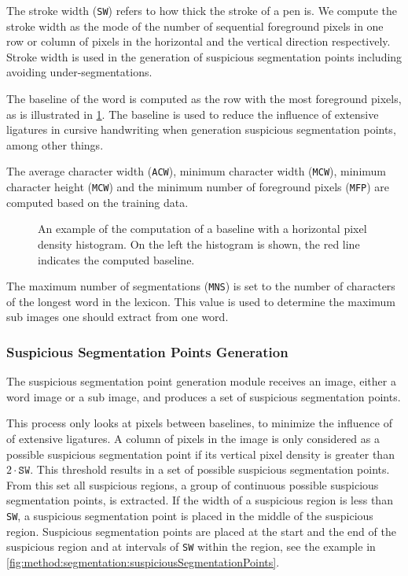	The stroke width (\texttt{SW}) refers to how thick the stroke of a pen is. We compute the stroke width as the mode of the number of sequential foreground pixels in one row or column of pixels in the horizontal and the vertical direction respectively. Stroke width is used in the generation of suspicious segmentation points including avoiding under-segmentations.

	The baseline of the word is computed as the row with the most foreground pixels, as is illustrated in \cref{fig:method:segmentation:baselinecomputation}. The baseline is used to reduce the influence of extensive ligatures in cursive handwriting when generation suspicious segmentation points, among other things.

	The average character width (\texttt{ACW}), minimum character width (\texttt{MCW}), minimum character height (\texttt{MCW}) and the minimum number of foreground pixels (\texttt{MFP}) are computed based on the training data.

	\begin{figure}
		\centering
		\caption{An example of the computation of a baseline with a horizontal pixel density histogram. On the left the histogram is shown, the red line indicates the computed baseline.}
		\label{fig:method:segmentation:baselinecomputation}
	\end{figure}

	The maximum number of segmentations (\texttt{MNS}) is set to the number of characters of the longest word in the lexicon. This value is used to determine the maximum sub images one should extract from one word. 

\subsubsection{Suspicious Segmentation Points Generation}
	\label{sss:method:segmentation:sspGeneration}
	The suspicious segmentation point generation module receives an image, either a word image or a sub image, and produces a set of suspicious segmentation points. 

	This process only looks at pixels between baselines, to minimize the influence of of extensive ligatures. A column of pixels in the image is only considered as a possible suspicious segmentation point if its vertical pixel density is greater than $2 \cdot \mathtt{SW}$. This threshold results in a set of possible suspicious segmentation points. From this set all suspicious regions, a group of continuous possible suspicious segmentation points, is extracted. If the width of a suspicious region is less than \texttt{SW}, a suspicious segmentation point is placed in the middle of the suspicious region. Suspicious segmentation points are placed at the start and the end of the suspicious region and at intervals of \texttt{SW} within the region, see the example in \cref{fig:method:segmentation:suspiciousSegmentationPoints}.

